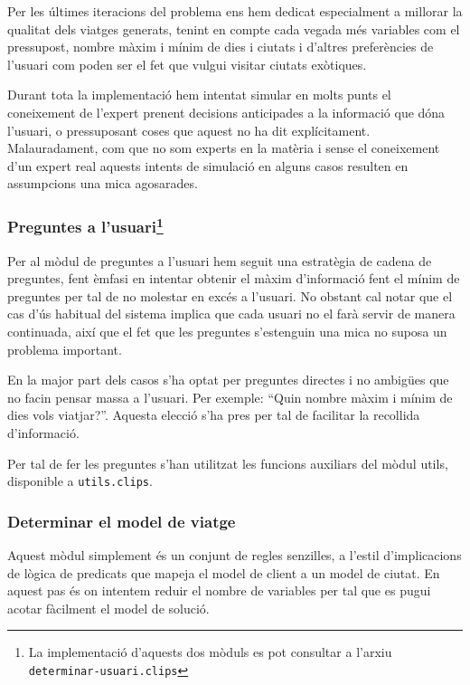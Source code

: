 \documentclass[11pt,a4paper]{article}
\begin{document}
Per les últimes iteracions del problema ens hem dedicat especialment a millorar la qualitat dels viatges generats, tenint en compte cada vegada més variables com el pressupost, nombre màxim i mínim de dies i ciutats i d'altres preferències de l'usuari com poden ser el fet que vulgui visitar ciutats exòtiques.

Durant tota la implementació hem intentat simular en molts punts el coneixement de l'expert prenent decisions anticipades a la informació que dóna l'usuari, o pressuposant coses que aquest no ha dit explícitament. Malauradament, com que no som experts en la matèria i sense el coneixement d'un expert real aquests intents de simulació en alguns casos resulten en assumpcions una mica agosarades.

\subsubsection*{Preguntes a l'usuari\footnote{La implementació d'aquests dos mòduls es pot consultar a l'arxiu \texttt{determinar-usuari.clips}}}

Per al mòdul de preguntes a l'usuari hem seguit una estratègia de cadena de preguntes, fent èmfasi en intentar obtenir el màxim d'informació fent el mínim de preguntes per tal de no molestar en excés a l'usuari. No obstant cal notar que el cas d'ús habitual del sistema implica que cada usuari no el farà servir de manera continuada, així que el fet que les preguntes s'estenguin una mica no suposa un problema important.

En la major part dels casos s'ha optat per preguntes directes i no ambigües que no facin pensar massa a l'usuari. Per exemple: ``Quin nombre màxim i mínim de dies vols viatjar?''. Aquesta elecció s'ha pres per tal de facilitar la recollida d'informació.

Per tal de fer les preguntes s'han utilitzat les funcions auxiliars del mòdul utils, disponible a \texttt{utils.clips}.

\subsubsection*{Determinar el model de viatge}

Aquest mòdul simplement és un conjunt de regles senzilles, a l'estil d'implicacions de lògica de predicats que mapeja el model de client a un model de ciutat. En aquest pas és on intentem reduir el nombre de variables per tal que es pugui acotar fàcilment el model de solució.\\
\end{document}
